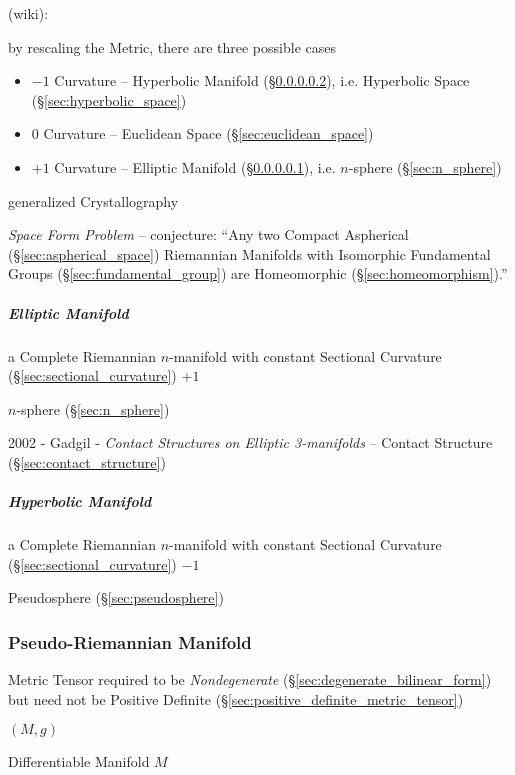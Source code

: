 (wiki):

by rescaling the Metric, there are three possible cases
\begin{itemize}
  \item $-1$ Curvature -- Hyperbolic Manifold (\S\ref{sec:hyperbolic_manifold}),
    i.e. Hyperbolic Space (\S\ref{sec:hyperbolic_space})
  \item $0$ Curvature -- Euclidean Space (\S\ref{sec:euclidean_space})
  \item $+1$ Curvature -- Elliptic Manifold (\S\ref{sec:elliptic_manifold}),
    i.e. $n$-sphere (\S\ref{sec:n_sphere})
\end{itemize}

generalized Crystallography

\emph{Space Form Problem} -- conjecture: ``Any two Compact Aspherical
(\S\ref{sec:aspherical_space}) Riemannian Manifolds with Isomorphic Fundamental
Groups (\S\ref{sec:fundamental_group}) are Homeomorphic
(\S\ref{sec:homeomorphism}).''



\subparagraph{Elliptic Manifold}\label{sec:elliptic_manifold}\hfill

a Complete Riemannian $n$-manifold with constant Sectional Curvature
(\S\ref{sec:sectional_curvature}) $+1$

$n$-sphere (\S\ref{sec:n_sphere})

2002 - Gadgil - \emph{Contact Structures on Elliptic 3-manifolds}
-- Contact Structure (\S\ref{sec:contact_structure})



\subparagraph{Hyperbolic Manifold}\label{sec:hyperbolic_manifold}\hfill

a Complete Riemannian $n$-manifold with constant Sectional Curvature
(\S\ref{sec:sectional_curvature}) $-1$

Pseudosphere (\S\ref{sec:pseudosphere})



\subsubsection{Pseudo-Riemannian Manifold}
\label{sec:pseudo_riemannian}

Metric Tensor required to be \emph{Nondegenerate}
(\S\ref{sec:degenerate_bilinear_form}) but need not be Positive
Definite (\S\ref{sec:positive_definite_metric_tensor})

$(M,g)$

Differentiable Manifold $M$

